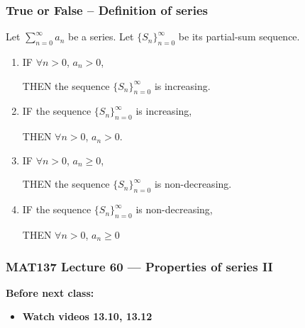 \documentclass[14pt]{beamer}
\newcommand{\azul}[1]{{\color{blue} #1}}
\newcommand{\rojo}[1]{{\color{red} #1}}
\newcommand{\setsize}[1]{\fontsize{#1}{#1}\selectfont} %
\newcommand{\vv}{\vspace{.5cm}}
\newcommand{\vvv}{\vspace{.2cm}}
\begin{document}
	\begin{frame}[t]
		\setsize{12}
		\frametitle{True or False -- Definition of series}

		Let ${\displaystyle \sum_{n=0}^{\infty} a_n}$ be a series. Let
		${\displaystyle \{ S_n \}_{n=0}^{\infty}}$ be its partial-sum sequence.

		\begin{enumerate}
			\addtocounter{enumi}{3}

			\item IF \azul{${\displaystyle \forall n >0}$, ${\displaystyle a_n>0}$}, \vvv

				THEN \rojo{the sequence ${\displaystyle \{ S_n \}_{n=0}^{\infty}}$ is increasing}.
				\vv

			\item IF \rojo{the sequence ${\displaystyle \{ S_n \}_{n=0}^{\infty}}$ is increasing},
				\\ \vvv

				THEN \azul{${\displaystyle \forall n >0}$, ${\displaystyle a_n>0}$}. \vv

			\item IF \azul{${\displaystyle \forall n >0}$, ${\displaystyle a_n\geq0}$},
				\vvv

				THEN \rojo{the sequence ${\displaystyle \{ S_n \}_{n=0}^{\infty}}$ is non-decreasing}.

				\vv

			\item IF \rojo{the sequence ${\displaystyle \{ S_n \}_{n=0}^{\infty}}$ is non-decreasing},
				\\ \vvv

				THEN \azul{${\displaystyle \forall n >0}$, ${\displaystyle a_n\geq0}$}
		\end{enumerate}
	\end{frame}



\begin{frame}
	\frametitle{MAT137 Lecture 60 --- Properties of series II}

	\vfill
	{\bf Before next class:}
		\begin{itemize} \normalsize
			\item {\bf Watch videos 13.10, 13.12 }
		\end{itemize}
\end{frame}
\end{document}
